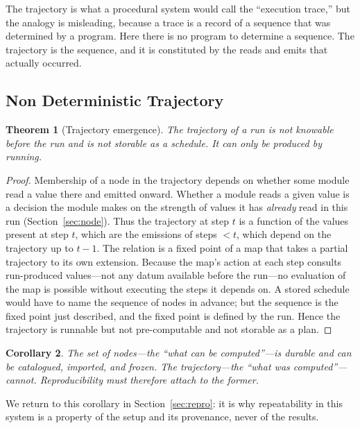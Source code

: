 \documentclass[11pt,a4paper,twocolumn]{article}
\newtheorem{theorem}{Theorem}
\newtheorem{corollary}[theorem]{Corollary}
\theoremstyle{definition}
\begin{document}
The trajectory is what a procedural system would call the ``execution trace,''
but the analogy is misleading, because a trace is a record of a sequence that
was determined by a program. Here there is no program to determine a sequence.
The trajectory is the sequence, and it is constituted by the reads and emits
that actually occurred.

\subsection{Non Deterministic Trajectory}

\begin{theorem}[Trajectory emergence]
\label{thm:emergence}
The trajectory of a run is not knowable before the run and is not storable as a
schedule. It can only be produced by running.
\end{theorem}

\begin{proof}
Membership of a node in the trajectory depends on whether some module read a
value there and emitted onward. Whether a module reads a given value is a
decision the module makes on the strength of values it has \emph{already} read
in this run (Section~\ref{sec:node}). Thus the trajectory at step $t$ is a
function of the values present at step $t$, which are the emissions of steps
$< t$, which depend on the trajectory up to $t{-}1$. The relation is a fixed
point of a map that takes a partial trajectory to its own extension. Because the
map's action at each step consults run-produced values---not any datum available
before the run---no evaluation of the map is possible without executing the
steps it depends on. A stored schedule would have to name the sequence of nodes
in advance; but the sequence is the fixed point just described, and the fixed
point is defined by the run. Hence the trajectory is runnable but not
pre-computable and not storable as a plan.
\end{proof}

\begin{corollary}
The set of nodes---the ``what can be computed''---is durable and can be
catalogued, imported, and frozen. The trajectory---the ``what was
computed''---cannot. Reproducibility must therefore attach to the former.
\end{corollary}

\noindent We return to this corollary in Section~\ref{sec:repro}: it is why
repeatability in this system is a property of the setup and its provenance, never
of the results.
\end{document}
